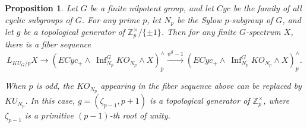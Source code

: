 \documentclass{amsart}
\theoremstyle{plain}
\newtheorem{proposition}[theorem]{Proposition}
\theoremstyle{definition}
\theoremstyle{remark}
\begin{document}
\begin{proposition}\label{thm:KUG local spectrum first case}
    Let $G$ be a finite nilpotent group, and let $Cyc$ be the family of all cyclic subgroups of $G$. For any prime $p$, let $N_p$ be the Sylow $p$-subgroup of $G$, and let $g$ be a topological generator of $\mathbb{Z}_p^{\times}/\{\pm 1\}$. Then for any finite $G$-spectrum $X$, there is a fiber sequence 
    \[
    L_{KU_G/p}X \longrightarrow (ECyc_+\wedge\ \operatorname{Inf}_{N_p}^G KO_{N_p}\wedge X)_p^{\wedge}\overset{\psi^g-1}{\longrightarrow} (ECyc_+\wedge\ \operatorname{Inf}_{N_p}^G KO_{N_p}\wedge X)_p^{\wedge} .
    \]
    
    When $p$ is odd, the $KO_{N_p}$ appearing in the fiber sequence above can be replaced by $KU_{N_p}$. In this case, $g=(\zeta_{p-1},p+1)$ is a topological generator of $\mathbb{Z}_p^{\times}$, where $\zeta_{p-1}$ is a primitive $(p-1)$-th root of unity.
\end{proposition}
\end{document}
